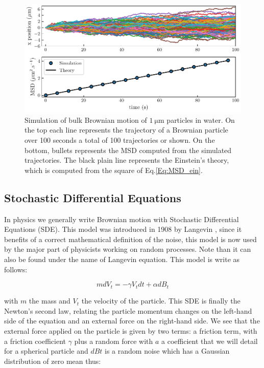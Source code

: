 \begin{figure}[!h]
	\centering
	\includegraphics{02_body/chapter1/image/brown_exemple.pdf}
	\caption{Simulation of bulk Brownian motion of $1 ~ \mathrm{\mu m}$ particles in water. On the top each line represents the trajectory of a Brownian particle over 100 seconds a total of 100 trajectories or shown. On the bottom, bullets represents the \gls{MSD} computed from the simulated trajectories. The black plain line represents the Einstein's theory, which is computed from the square of Eq.\ref{Eq:MSD_ein}.}
	\label{fig:bulkbrown}
\end{figure}

\subsection{Stochastic Differential Equations}

In physics we generally write Brownian motion with Stochastic Differential Equations (\gls{SDE}). This model was introduced in 1908 by Langevin \cite{langevin_sur_1908}, since it benefits of a correct mathematical definition of the noise, this model is now used by the major part of physicists working on random processes. Note than it can also be found under the name of Langevin equation. This model is write as follows:

\begin{equation}
	mdV_t  = - \gamma V_t dt + \alpha dB_t 
\end{equation}


with $m$ the mass and $V_t$ the velocity of the particle. This \gls{SDE} is finally the Newton's second law, relating the particle momentum changes on the left-hand side of the equation and an external force on the right-hand side. We see that the external force applied on the particle is given by two terms: a friction term, with a friction coefficient $\gamma$ plus a random force with $a$ a coefficient that we will detail for a spherical particle and $dBt$ is a random noise which has a Gaussian distribution of zero mean thus:


